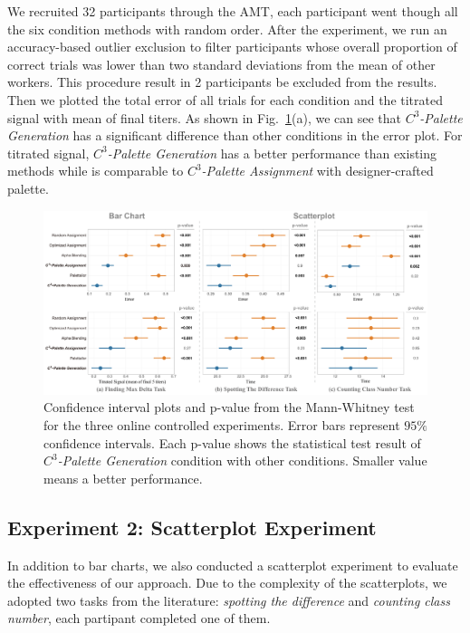 We recruited 32 participants through the AMT, each participant went though all the six condition methods with random order. After the experiment, we run an accuracy-based outlier exclusion to filter participants whose overall proportion of correct trials was lower than two standard deviations from the mean of other workers. This procedure result in 2 participants be excluded from the results. Then we plotted the total error of all trials for each condition and the titrated signal with mean of final titers. As shown in Fig.~\ref{fig:userResults}(a), we can see that \emph{$C^3$-Palette Generation} has a significant difference than other conditions in the error plot. For titrated signal, \emph{$C^3$-Palette Generation} has a better performance than existing methods while is comparable to \emph{$C^3$-Palette Assignment} with designer-crafted palette.

\begin{figure}[t]
\centering
\includegraphics[width=1\linewidth]{figures/user-result-formal.pdf}
\caption{Confidence interval plots and p-value from the Mann-Whitney test for the three online controlled experiments. Error bars represent $95\%$ confidence intervals. Each p-value shows the statistical test result of \emph{$C^3$-Palette Generation} condition with other conditions. Smaller value means a better performance.}
\vspace*{-3mm}
\label{fig:userResults}
\end{figure}

\subsection{Experiment 2: Scatterplot Experiment}
\label{subsec:scatterplotExp}
In addition to bar charts, we also conducted a scatterplot experiment to evaluate the effectiveness of our approach. Due to the complexity of the scatterplots, we adopted two tasks from the literature: \emph{spotting the difference} and \emph{counting class number}, each partipant completed one of them.

